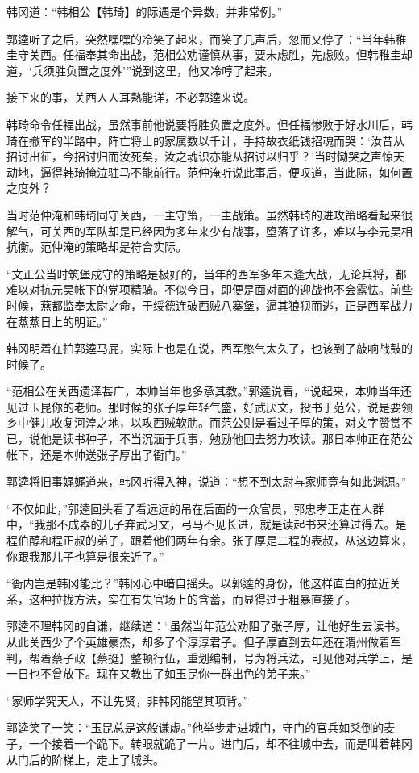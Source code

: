 韩冈道：“韩相公【韩琦】的际遇是个异数，并非常例。”

郭逵听了之后，突然嘿嘿的冷笑了起来，而笑了几声后，忽而又停了：“当年韩稚圭守关西。任福奉其命出战，范相公劝谨慎从事，要未虑胜，先虑败。但韩稚圭却道，‘兵须胜负置之度外’”说到这里，他又冷哼了起来。

接下来的事，关西人人耳熟能详，不必郭逵来说。

韩琦命令任福出战，虽然事前他说要将胜负置之度外。但任福惨败于好水川后，韩琦在撤军的半路中，阵亡将士的家属数以千计，手持故衣纸钱招魂而哭：‘汝昔从招讨出征，今招讨归而汝死矣，汝之魂识亦能从招讨以归乎？’当时恸哭之声惊天动地，逼得韩琦掩泣驻马不能前行。范仲淹听说此事后，便叹道，当此际，如何置之度外？

当时范仲淹和韩琦同守关西，一主守策，一主战策。虽然韩琦的进攻策略看起来很解气，可关西的军队却是已经因为多年来少有战事，堕落了许多，难以与李元昊相抗衡。范仲淹的策略却是符合实际。

“文正公当时筑堡戍守的策略是极好的，当年的西军多年未逢大战，无论兵将，都难以对抗元昊帐下的党项精骑。不似今日，即便是面对面的迎战也不会露怯。前些时候，燕都监奉太尉之命，于绥德连破西贼八寨堡，逼其狼狈而逃，正是西军战力在蒸蒸日上的明证。”

韩冈明着在拍郭逵马屁，实际上也是在说，西军憋气太久了，也该到了敲响战鼓的时候了。

“范相公在关西遗泽甚广，本帅当年也多承其教。”郭逵说着，“说起来，本帅当年还见过玉昆你的老师。那时候的张子厚年轻气盛，好武厌文，投书于范公，说是要领乡中健儿收复河湟之地，以攻西贼软肋。而范公则是看过子厚的策，对文字赞赏不已，说他是读书种子，不当沉湎于兵事，勉励他回去努力攻读。那日本帅正在范公帐下，还是本帅送张子厚出了衙门。”

郭逵将旧事娓娓道来，韩冈听得入神，说道：“想不到太尉与家师竟有如此渊源。”

“不仅如此，”郭逵回头看了看远远的吊在后面的一众官员，郭忠孝正走在人群中，“我那不成器的儿子弃武习文，弓马不见长进，就是读起书来还算过得去。是程伯醇和程正叔的弟子，跟着他们两年有余。张子厚是二程的表叔，从这边算来，你跟我那儿子也算是很亲近了。”

“衙内岂是韩冈能比？”韩冈心中暗自摇头。以郭逵的身份，他这样直白的拉近关系，这种拉拢方法，实在有失官场上的含蓄，而显得过于粗暴直接了。

郭逵不理韩冈的自谦，继续道：“虽然当年范公劝阻了张子厚，让他好生去读书。从此关西少了个英雄豪杰，却多了个淳淳君子。但子厚直到去年还在渭州做着军判，帮着蔡子政【蔡挺】整顿行伍，重划编制，号为将兵法，可见他对兵学上，是一日也不曾放下。现在又教出了如玉昆你一群出色的弟子来。”

“家师学究天人，不让先贤，非韩冈能望其项背。”

郭逵笑了一笑：“玉昆总是这般谦虚。”他举步走进城门，守门的官兵如爻倒的麦子，一个接着一个跪下。转眼就跪了一片。进门后，却不往城中去，而是叫着韩冈从门后的阶梯上，走上了城头。

